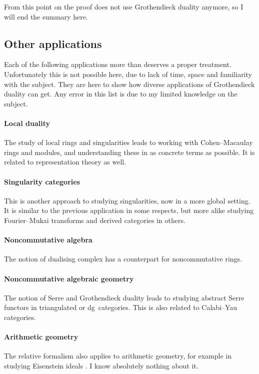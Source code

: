 From this point on the proof does not use Grothendieck duality anymore, so I will end the summary here.


\subsection{Other applications}
Each of the following applications more than deserves a proper treatment. Unfortunately this is not possible here, due to lack of time, space and familiarity with the subject. They are here to show how diverse applications of Grothendieck duality can get. Any error in this list is due to my limited knowledge on the subject.

\paragraph{Local duality}
The study of local rings and singularities leads to working with Cohen--Macaulay rings and modules, and understanding these in as concrete terms as possible. It is related to representation theory as well.

\paragraph{Singularity categories}
This is another approach to studying singularities, now in a more global setting. It is similar to the previous application in some respects, but more alike studying Fourier--Mukai transforms and derived categories in others.

\paragraph{Noncommutative algebra}
The notion of dualising complex has a counterpart for noncommutative rings.

\paragraph{Noncommutative algebraic geometry}
The notion of Serre and Grothendieck duality leads to studying abstract Serre functors in triangulated or dg~categories. This is also related to Calabi--Yau categories.

\paragraph{Arithmetic geometry}
The relative formalism also applies to arithmetic geometry, for example in studying Eisenstein ideals \cite{mazur-modular-curves-eisenstein-ideal}. I know absolutely nothing about it.


